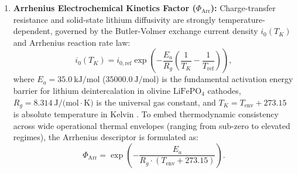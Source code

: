 \begin{enumerate}
	\item \textbf{Arrhenius Electrochemical Kinetics Factor ($\Phi_{\text{Arr}}$):}
	Charge-transfer resistance and solid-state lithium diffusivity are strongly temperature-dependent, governed by the Butler-Volmer exchange current density $i_0(T_K)$ and Arrhenius reaction rate law:
	\begin{equation}
		\label{eq:arrhenius_derivation}
		i_0(T_K) = i_{0,\text{ref}} \exp\left( -\frac{E_a}{R_g} \left( \frac{1}{T_K} - \frac{1}{T_{\text{ref}}} \right) \right),
	\end{equation}
	where $E_a = 35.0\ \text{kJ/mol}$ ($35000.0\ \text{J/mol}$) is the fundamental activation energy barrier for lithium deintercalation in olivine $\text{LiFePO}_4$ cathodes, $R_g = 8.314\ \text{J/(mol}\cdot\text{K)}$ is the universal gas constant, and $T_K = T_{\text{env}} + 273.15$ is absolute temperature in Kelvin \cite{rahimirad2019battery, li2026condition}. To embed thermodynamic consistency across wide operational thermal envelopes (ranging from sub-zero to elevated regimes), the Arrhenius descriptor is formulated as:
	\begin{equation}
		\label{eq:arrhenius_kinetics}
		\Phi_{\text{Arr}} = \exp\left( -\frac{E_a}{R_g \cdot (T_{\text{env}} + 273.15)} \right).
	\end{equation}
\end{enumerate}

